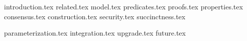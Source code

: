 {introduction.tex}
{related.tex}
{model.tex}
{predicates.tex}
{proofs.tex}
{properties.tex}
{consensus.tex}
{construction.tex}
{security.tex}
{succinctness.tex}

{parameterization.tex}
{integration.tex}
{upgrade.tex}
{future.tex}
